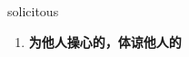 
\begin{frame}
{\huge solicitous}
\begin{center}
\begin{enumerate}\Large
  \item \textbf{为他人操心的，体谅他人的}
\end{enumerate}
\end{center}
\end{frame}
